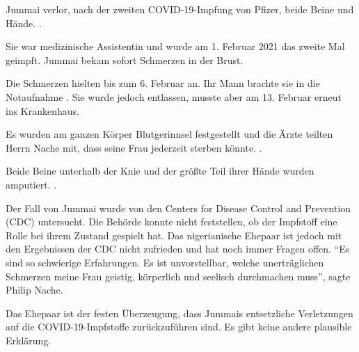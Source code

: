 Jummai verlor, nach der zweiten COVID-19-Impfung von Pfizer, beide Beine und
Hände. .

Sie war medizinische Assistentin und wurde am 1. Februar 2021 das zweite Mal
geimpft. Jummai bekam sofort Schmerzen in der Brust.

Die Schmerzen hielten bis zum 6. Februar an. Ihr Mann brachte sie in die
Notaufnahme . Sie wurde jedoch entlassen, musste aber am 13. Februar erneut ins
Krankenhaus.

Es wurden am ganzen Körper Blutgerinnsel festgestellt und die Ärzte teilten
Herrn Nache mit, dass seine Frau jederzeit sterben könnte. .

Beide Beine unterhalb der Knie und der größte Teil ihrer Hände wurden
amputiert. .

Der Fall von Jummai wurde von den Centers for Disease Control and Prevention
(CDC) untersucht. Die Behörde konnte nicht feststellen, ob der Impfstoff eine
Rolle bei ihrem Zustand gespielt hat. Das nigerianische Ehepaar ist jedoch mit
den Ergebnissen der CDC nicht zufrieden und hat noch immer Fragen offen. “Es
sind so schwierige Erfahrungen. Es ist unvorstellbar, welche unerträglichen
Schmerzen meine Frau geistig, körperlich und seelisch durchmachen muss”, sagte
Philip Nache.

Das Ehepaar ist der festen Überzeugung, dass Jummais entsetzliche Verletzungen
auf die COVID-19-Impfstoffe zurückzuführen sind. Es gibt keine andere plausible
Erklärung.
